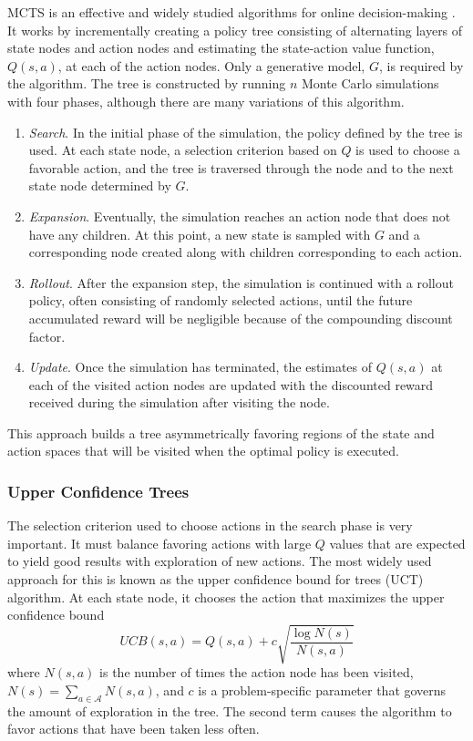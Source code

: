 MCTS is an effective and widely studied algorithms for online decision-making \cite{browne2012survey}.
It works by incrementally creating a policy tree consisting of alternating layers of state nodes and action nodes and estimating the state-action value function, $Q(s,a)$, at each of the action nodes.
Only a generative model, $G$, is required by the algorithm.
The tree is constructed by running $n$ Monte Carlo simulations with four phases, although there are many variations of this algorithm.
\begin{enumerate}
    \item \emph{Search}. In the initial phase of the simulation, the policy defined by the tree is used.
        At each state node, a selection criterion based on $Q$ is used to choose a favorable action, and the tree is traversed through the node and to the next state node determined by $G$.
    \item \emph{Expansion}. Eventually, the simulation reaches an action node that does not have any children.
        At this point, a new state is sampled with $G$ and a corresponding node created along with children corresponding to each action. 
    \item \emph{Rollout}. After the expansion step, the simulation is continued with a rollout policy, often consisting of randomly selected actions, until the future accumulated reward will be negligible because of the compounding discount factor.
    \item \emph{Update}. Once the simulation has terminated, the estimates of $Q(s,a)$ at each of the visited action nodes are updated with the discounted reward received during the simulation after visiting the node.
\end{enumerate}
This approach builds a tree asymmetrically favoring regions of the state and action spaces that will be visited when the optimal policy is executed.

\subsubsection{Upper Confidence Trees} \label{sec:uct}

The selection criterion used to choose actions in the search phase is very important.
It must balance favoring actions with large $Q$ values that are expected to yield good results with exploration of new actions.
The most widely used approach for this is known as the upper confidence bound for trees (UCT) algorithm.
At each state node, it chooses the action that maximizes the upper confidence bound
\begin{equation} \label{eqn:ucb}
    UCB(s,a) = Q(s,a) + c \sqrt{\frac{\log N(s)}{N(s,a)}}
\end{equation}
where $N(s,a)$ is the number of times the action node has been visited, $N(s) = \sum_{a \in \mathcal{A}} N(s,a)$, and $c$ is a problem-specific parameter that governs the amount of exploration in the tree.
The second term causes the algorithm to favor actions that have been taken less often.

